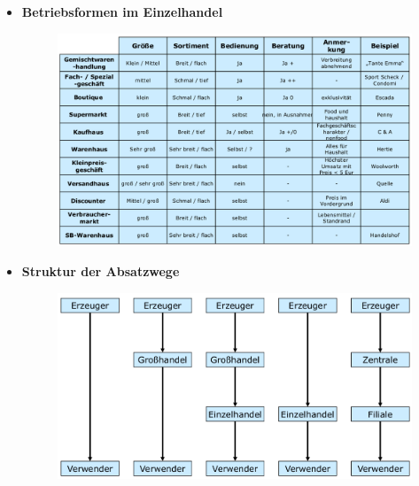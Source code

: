 \documentclass[a4paper,11pt, twoside]{article}
\begin{document}
\begin{itemize}
	\item \textbf{Betriebsformen im Einzelhandel}
\begin{figure}[h]
 \begin{center}
   \includegraphics[scale=0.2]{bilder/betriebsformen_einzelhandel.png}
 \end{center}
\end{figure}
\newpage
	\item \textbf{Struktur der Absatzwege}
\begin{figure}[h]
 \begin{center}
   \includegraphics[scale=0.2]{bilder/absatzwege.png}
 \end{center}
\end{figure}


\end{itemize}
\end{document}
